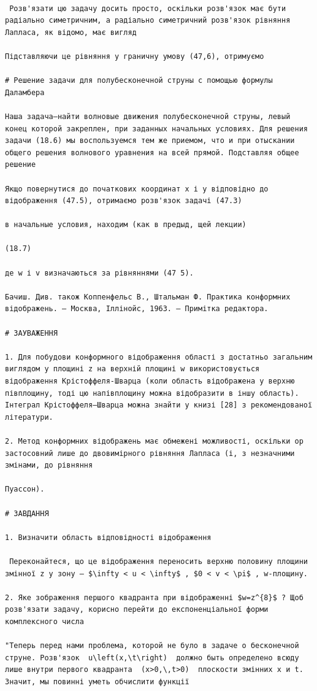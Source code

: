 \documentclass[
  ukrainian,
]{article}
\begin{document}
\begin{verbatim}

 Розв'язати цю задачу досить просто, оскільки розв'язок має бути радіально симетричним, а радіально симетричний розв'язок рівняння Лапласа, як відомо, має вигляд

Підставляючи це рівняння у граничну умову (47,6), отримуємо

# Решение задачи для полубесконечной струны с помощью формулы Даламбера

Наша задача—найти волновые движения полубесконечной струны, левый конец которой закреплен, при заданных начальных условиях. Для решения задачи (18.6) мы воспользуемся тем же приемом, что и при отыскании общего решения волнового уравнения на всей прямой. Подставляя общее решение

Якщо повернутися до початкових координат x і y відповідно до відображення (47.5), отримаємо розв'язок задачі (47.3)

в начальные условия, находим (как в предыд, щей лекции)

(18.7)

де w і v визначаються за рівняннями (47 5).

Бачиш. Див. також Коппенфельс В., Штальман Ф. Практика конформних відображень. — Москва, Іллінойс, 1963. — Примітка редактора.

# ЗАУВАЖЕННЯ

1. Для побудови конформного відображення області з достатньо загальним виглядом у площині z на верхній площині w використовується відображення Крістоффеля-Шварца (коли область відображена у верхню півплощину, тоді цю напівплощину можна відобразити в іншу область). Інтеграл Крістоффеля–Шварца можна знайти у книзі [28] з рекомендованої літератури.

2. Метод конформних відображень має обмежені можливості, оскільки op застосовний лише до двовимірного рівняння Лапласа (і, з незначними змінами, до рівняння

Пуассон).

# ЗАВДАННЯ

1. Визначити область відповідності відображення

 Переконайтеся, що це відображення переносить верхню половину площини змінної z у зону — $\infty < u < \infty$ , $0 < v < \pi$ , w-площину.

2. Яке зображення першого квадранта при відображенні $w=z^{8}$ ? Щоб розв'язати задачу, корисно перейти до експоненціальної форми комплексного числа

"Теперь перед нами проблема, которой не було в задаче о бесконечной струне. Розв'язок  u\left(x,\t\right)  должно быть определено всюду лише внутри первого квадранта  (x>0,\,t>0)  плоскости змінних x и t. Значит, мы повинні уметь обчислити функції


\end{verbatim}
\end{document}

